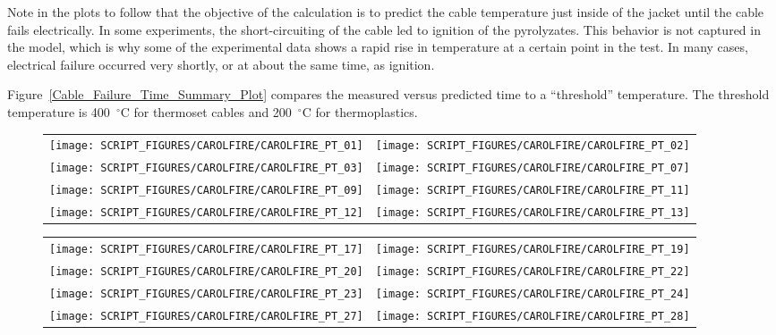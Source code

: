 Note in the plots to follow that the objective of the calculation is to predict the cable temperature just inside of the jacket until the cable fails electrically. In some experiments, the short-circuiting of the cable led to ignition of the pyrolyzates. This behavior is not captured in the model, which is why some of the experimental data shows a rapid rise in temperature at a certain point in the test. In many cases, electrical failure occurred very shortly, or at about the same time, as ignition.

Figure~\ref{Cable_Failure_Time_Summary_Plot} compares the measured versus predicted time to a ``threshold'' temperature. The threshold temperature is 400~$^\circ$C for thermoset cables and 200~$^\circ$C for thermoplastics.

\newpage

\begin{figure}[p]
\begin{tabular*}{\textwidth}{l@{\extracolsep{\fill}}r}
\texttt{[image: SCRIPT\_FIGURES/CAROLFIRE/CAROLFIRE\_PT\_01]} &
\texttt{[image: SCRIPT\_FIGURES/CAROLFIRE/CAROLFIRE\_PT\_02]} \\
\texttt{[image: SCRIPT\_FIGURES/CAROLFIRE/CAROLFIRE\_PT\_03]} &
\texttt{[image: SCRIPT\_FIGURES/CAROLFIRE/CAROLFIRE\_PT\_07]} \\
\texttt{[image: SCRIPT\_FIGURES/CAROLFIRE/CAROLFIRE\_PT\_09]} &
\texttt{[image: SCRIPT\_FIGURES/CAROLFIRE/CAROLFIRE\_PT\_11]} \\
\texttt{[image: SCRIPT\_FIGURES/CAROLFIRE/CAROLFIRE\_PT\_12]} &
\texttt{[image: SCRIPT\_FIGURES/CAROLFIRE/CAROLFIRE\_PT\_13]}
\end{tabular*}
\label{CAROLFIRE_Thermoset_1}
\end{figure}

\begin{figure}[p]
\begin{tabular*}{\textwidth}{l@{\extracolsep{\fill}}r}
\texttt{[image: SCRIPT\_FIGURES/CAROLFIRE/CAROLFIRE\_PT\_17]} &
\texttt{[image: SCRIPT\_FIGURES/CAROLFIRE/CAROLFIRE\_PT\_19]} \\
\texttt{[image: SCRIPT\_FIGURES/CAROLFIRE/CAROLFIRE\_PT\_20]} &
\texttt{[image: SCRIPT\_FIGURES/CAROLFIRE/CAROLFIRE\_PT\_22]} \\
\texttt{[image: SCRIPT\_FIGURES/CAROLFIRE/CAROLFIRE\_PT\_23]} &
\texttt{[image: SCRIPT\_FIGURES/CAROLFIRE/CAROLFIRE\_PT\_24]} \\
\texttt{[image: SCRIPT\_FIGURES/CAROLFIRE/CAROLFIRE\_PT\_27]} &
\texttt{[image: SCRIPT\_FIGURES/CAROLFIRE/CAROLFIRE\_PT\_28]}
\end{tabular*}
\label{CAROLFIRE_Thermoset_2}
\end{figure}

